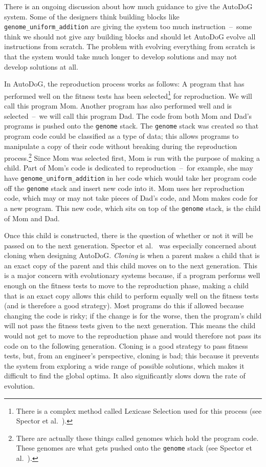 \documentclass{sig-alternate}
\begin{document}
There is an ongoing discussion about how much guidance to give the AutoDoG system. Some of the designers think building blocks like \texttt{genome\_uniform\_addition} are giving the system too much instruction~--~some think we should not give any building blocks and should let AutoDoG evolve all instructions from scratch. The problem with evolving everything from scratch is that the system would take much longer to develop solutions and may not develop solutions at all.~\cite{lee:2001,clojush,spector:2016}

In AutoDoG, the reproduction process works as follows:
A program that has performed well on the fitness tests has been selected\footnote{There is a complex method called Lexicase Selection used for this process (see Spector et al.~\cite{spector:2016}).} for reproduction. We will call this program Mom. Another program has also performed well and is selected~--~we will call this program Dad. The code from both Mom and Dad's programs is pushed onto the \texttt{genome} stack. The \texttt{genome} stack was created so that program code could be classified as a type of data; this allows programs to manipulate a copy of their code without breaking during the reproduction process.\footnote{There are actually these things called genomes which hold the program code. These genomes are what gets pushed onto the \texttt{genome} stack (see Spector et al.~\cite{spector:2016}).} Since Mom was selected first, Mom is run with the purpose of making a child. Part of Mom's code is dedicated to reproduction~--~for example, she may have \texttt{genome\_uniform\_addition} in her code which would take her program code off the \texttt{genome} stack and insert new code into it. Mom uses her reproduction code, which may or may not take pieces of Dad's code, and Mom makes code for a new program. This new code, which sits on top of the \texttt{genome} stack, is the child of Mom and Dad.

Once this child is constructed, there is the question of whether or not it will be passed on to the next generation. Spector et al.~\cite{spector:2016} was especially concerned about cloning when designing AutoDoG. \textit{Cloning} is when a parent makes a child that is an exact copy of the parent and this child moves on to the next generation. This is a major concern with evolutionary systems because, if a program performs well enough on the fitness tests to move to the reproduction phase, making a child that is an exact copy allows this child to perform equally well on the fitness tests (and is therefore a good strategy). Most programs do this if allowed because changing the code is risky; if the change is for the worse, then the program's child will not pass the fitness tests given to the next generation. This means the child would not get to move to the reproduction phase and would therefore not pass its code on to the following generation. Cloning is a good strategy to pass fitness tests, but, from an engineer's perspective, cloning is bad; this because it prevents the system from exploring a wide range of possible solutions, which makes it difficult to find the global optima. It also significantly slows down the rate of evolution.
\end{document}
